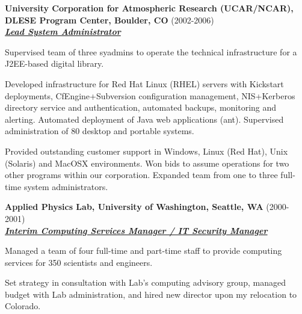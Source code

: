 \documentclass{article}
\newcommand{\employer}[3]{{ \textbf{#1} (#2)\\ \underline{\textbf{\emph{#3}}}\\ \nopagebreak }}
\newenvironment{achievements}{\begin{list}{\topsep 0pt \itemsep -2pt}} {\vspace*{4pt}\end{list}}
\begin{document}
\employer{University Corporation for Atmospheric Research (UCAR/NCAR), DLESE Program Center, Boulder, CO}{2002-2006}{Lead System Administrator}
\begin{achievements}
    \item Supervised team of three syadmins to operate the technical infrastructure for a J2EE-based digital library.
    \item Developed infrastructure for Red Hat Linux (RHEL) servers with Kickstart deployments, CfEngine+Subversion configuration management, NIS+Kerberos directory service and authentication, automated backups, monitoring and alerting. Automated deployment of Java web applications (ant). Supervised administration of 80 desktop and portable systems.
    \item Provided outstanding customer support in Windows, Linux (Red Hat), Unix (Solaris) and MacOSX environments. Won bids to assume operations for two other programs within our corporation. Expanded team from one to three full-time system administrators.
\end{achievements}


\employer{Applied Physics Lab, University of Washington, Seattle, WA}{2000-2001}{Interim Computing Services Manager / IT Security Manager}
\begin{achievements}
    \item Managed a team of four full-time and part-time staff to provide computing services for 350 scientists and engineers.
    \item Set strategy in consultation with Lab's computing advisory group, managed budget with Lab administration, and hired new director upon my relocation to Colorado.
\end{achievements}
\end{document}
